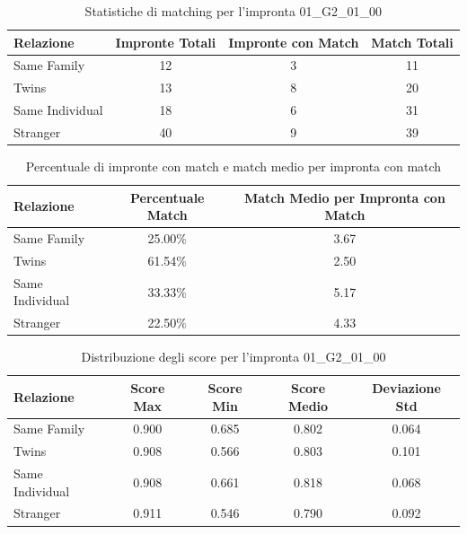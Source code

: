 \begin{table}[htbp]
\centering
\caption{Statistiche di matching per l'impronta 01\_G2\_01\_00}
\label{tab:results_01_G2_01_00}
\begin{tabular}{|l|c|c|c|}
\hline
\textbf{Relazione} & \textbf{Impronte Totali} & \textbf{Impronte con Match} & \textbf{Match Totali} \\
\hline
Same Family & 12 & 3 & 11 \\
\hline
Twins & 13 & 8 & 20 \\
\hline
Same Individual & 18 & 6 & 31 \\
\hline
Stranger & 40 & 9 & 39 \\
\hline
\end{tabular}
\end{table}


\begin{table}[htbp]
\centering
\caption{Percentuale di impronte con match e match medio per impronta con match}
\label{tab:match_percentage_01_G2_01_00}
\begin{tabular}{|l|c|c|}
\hline
\textbf{Relazione} & \textbf{Percentuale Match} & \textbf{Match Medio per Impronta con Match} \\
\hline
Same Family & 25.00\% & 3.67 \\
\hline
Twins & 61.54\% & 2.50 \\
\hline
Same Individual & 33.33\% & 5.17 \\
\hline
Stranger & 22.50\% & 4.33 \\
\hline
\end{tabular}
\end{table}


\begin{table}[htbp]
\centering
\caption{Distribuzione degli score per l'impronta 01\_G2\_01\_00}
\label{tab:scores_01_G2_01_00}
\begin{tabular}{|l|c|c|c|c|}
\hline
\textbf{Relazione} & \textbf{Score Max} & \textbf{Score Min} & \textbf{Score Medio} & \textbf{Deviazione Std} \\
\hline
Same Family & 0.900 & 0.685 & 0.802 & 0.064 \\
\hline
Twins & 0.908 & 0.566 & 0.803 & 0.101 \\
\hline
Same Individual & 0.908 & 0.661 & 0.818 & 0.068 \\
\hline
Stranger & 0.911 & 0.546 & 0.790 & 0.092 \\
\hline
\end{tabular}
\end{table}

